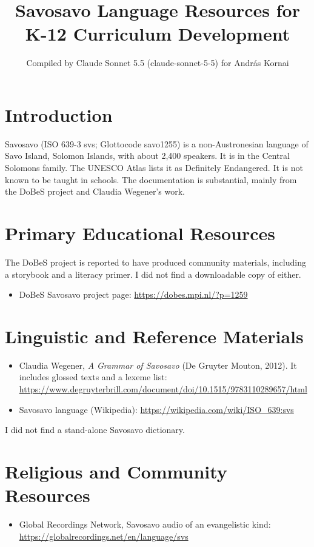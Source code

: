\documentclass[12pt]{article}
\title{Savosavo Language Resources for K-12 Curriculum Development}
\author{Compiled by Claude Sonnet 5.5 (claude-sonnet-5-5) for Andr\'as Kornai}
\date{}
\begin{document}
\maketitle

\section{Introduction}
Savosavo (ISO 639-3 svs; Glottocode savo1255) is a non-Austronesian language of Savo Island, Solomon Islands, with about 2,400 speakers. It is in the Central Solomons family. The UNESCO Atlas lists it as Definitely Endangered. It is not known to be taught in schools. The documentation is substantial, mainly from the DoBeS project and Claudia Wegener's work.

\section{Primary Educational Resources}
The DoBeS project is reported to have produced community materials, including a storybook and a literacy primer. I did not find a downloadable copy of either.
\begin{itemize}
\item DoBeS Savosavo project page: \url{https://dobes.mpi.nl/?p=1259}
\end{itemize}

\section{Linguistic and Reference Materials}
\begin{itemize}
\item Claudia Wegener, \emph{A Grammar of Savosavo} (De Gruyter Mouton, 2012). It includes glossed texts and a lexeme list: \url{https://www.degruyterbrill.com/document/doi/10.1515/9783110289657/html}
\item Savosavo language (Wikipedia): \url{https://wikipedia.com/wiki/ISO_639:svs}
\end{itemize}
I did not find a stand-alone Savosavo dictionary.

\section{Religious and Community Resources}
\begin{itemize}
\item Global Recordings Network, Savosavo audio of an evangelistic kind: \url{https://globalrecordings.net/en/language/svs}
\end{itemize}
\end{document}
